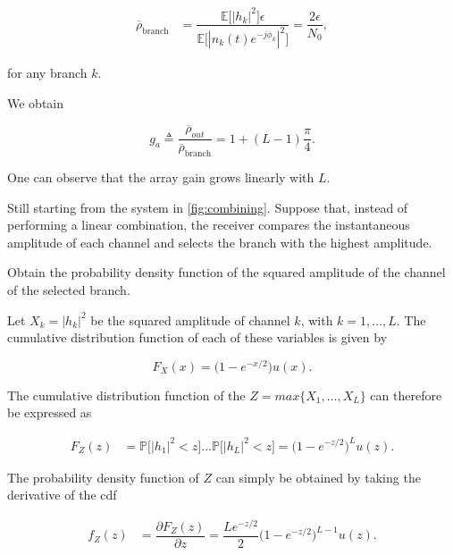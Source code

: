 \documentclass [a4paper, 11pt] {article}
\begin{document}
\begin{solution}
\begin{enumerate}
    \begin{align}
    \overline{\rho}_{\text{branch}} &= \dfrac{\mathbb{E}\bigg[ |h_k|^2 \bigg] \epsilon}{\mathbb{E}\Big[ |n_k(t)e^{-j\phi_k}|^2\Big]} = \dfrac{2\epsilon}{N_0},
    \end{align}
    
    for any branch $k$. 
    
    We obtain
    
    \begin{equation}
    g_a \triangleq \frac{\overline{\rho}_{out}}{\overline{\rho}_{\text{branch}}} = 1 + (L-1)\dfrac{\pi}{4}.
    \end{equation}
    
    One can observe that the array gain grows linearly with $L$.
\end{enumerate}

  
    \end{solution}
    
    
    \begin{exercise}{3}
    Still starting from the system in \autoref{fig:combining}. Suppose that, instead of performing a linear combination, the receiver compares the instantaneous amplitude of each channel and selects the branch with the highest amplitude.

    Obtain the probability density function of the squared amplitude of the channel of the selected branch.
    \end{exercise}
    
    \begin{solution}
    
        Let $X_k = |h_k|^2$ be the squared amplitude of channel $k$, with $k=1,\hdots,L$.
The cumulative distribution function of each of these variables is given by 

    \begin{equation}
        F_X(x) = \big(1 - e^{-x/2}\big)u(x).
        \end{equation}
 
 The cumulative distribution function of the $Z = max\{X_1, \hdots, X_L \}$ can therefore be expressed as 
 
\begin{align}
    F_Z(z)&= \mathbb{P}\Big[|h_1|^2 < z \Big] \hdots \mathbb{P}\Big[|h_L|^2 < z \Big] = \Big(1 - e^{-z/2} \Big)^L u(z). 
\end{align} 
 
The probability density function of $Z$ can simply be obtained by taking the derivative of the cdf

\begin{align}
    f_Z(z)&= \dfrac{\partial F_Z(z)}{\partial z} = \dfrac{Le^{-z/2}}{2} \Big(1 - e^{-z/2} \Big)^{L-1} u(z).
\end{align} 

    
    \end{solution}
        
\end{document}
